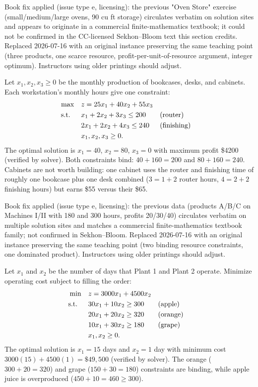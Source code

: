 \begin{qaflag}
Book fix applied (issue type e, licensing): the previous "Oven Store" exercise (small/medium/large ovens, 90 cu ft storage) circulates verbatim on solution sites and appears to originate in a commercial finite-mathematics textbook; it could not be confirmed in the CC-licensed Sekhon--Bloom text this section credits. Replaced 2026-07-16 with an original instance preserving the same teaching point (three products, one scarce resource, profit-per-unit-of-resource argument, integer optimum). Instructors using older printings should adjust.
\end{qaflag}


Let $x_1, x_2, x_3 \geq 0$ be the monthly production of bookcases, desks, and cabinets. Each workstation's monthly hours give one constraint:
\begin{align*}
\max \quad & z = 25x_1 + 40x_2 + 55x_3\\
\text{s.t.}\;\; \quad & x_1 + 2x_2 + 3x_3 \leq 200 && \text{(router)}\\
& 2x_1 + 2x_2 + 4x_3 \leq 240 && \text{(finishing)}\\
& x_1, x_2, x_3 \geq 0.
\end{align*}
The optimal solution is $x_1 = 40$, $x_2 = 80$, $x_3 = 0$ with maximum profit \$4200 (verified by solver). Both constraints bind: $40 + 160 = 200$ and $80 + 160 = 240$. Cabinets are not worth building: one cabinet uses the router and finishing time of roughly one bookcase plus one desk combined ($3 = 1+2$ router hours, $4 = 2+2$ finishing hours) but earns \$55 versus their \$65.

\begin{qaflag}
Book fix applied (issue type e, licensing): the previous data (products A/B/C on Machines I/II with 180 and 300 hours, profits 20/30/40) circulates verbatim on multiple solution sites and matches a commercial finite-mathematics textbook family; not confirmed in Sekhon--Bloom. Replaced 2026-07-16 with an original instance preserving the same teaching point (two binding resource constraints, one dominated product). Instructors using older printings should adjust.
\end{qaflag}


Let $x_1$ and $x_2$ be the number of days that Plant 1 and Plant 2 operate. Minimize operating cost subject to filling the order:
\begin{align*}
\min \quad & z = 3000x_1 + 4500x_2\\
\text{s.t.}\;\; \quad & 30x_1 + 10x_2 \geq 300 && \text{(apple)}\\
& 20x_1 + 20x_2 \geq 320 && \text{(orange)}\\
& 10x_1 + 30x_2 \geq 180 && \text{(grape)}\\
& x_1, x_2 \geq 0.
\end{align*}
The optimal solution is $x_1 = 15$ days and $x_2 = 1$ day with minimum cost $3000(15) + 4500(1) = \$49{,}500$ (verified by solver). The orange ($300 + 20 = 320$) and grape ($150 + 30 = 180$) constraints are binding, while apple juice is overproduced ($450 + 10 = 460 \geq 300$).

